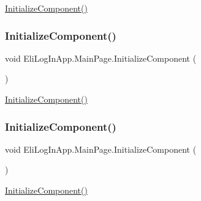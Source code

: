 \hyperlink{class_eli_log_in_app_1_1_main_page_a7f0e43eb30fdabe71d3e986d17322783}{Initialize\+Component()} 

\mbox{\label{class_eli_log_in_app_1_1_main_page_a7f0e43eb30fdabe71d3e986d17322783}} 
\subsubsection{\texorpdfstring{Initialize\+Component()}{InitializeComponent()}\hspace{0.1cm}{\footnotesize\ttfamily [2/3]}}
{\footnotesize\ttfamily void Eli\+Log\+In\+App.\+Main\+Page.\+Initialize\+Component (\begin{DoxyParamCaption}{ }\end{DoxyParamCaption})\hspace{0.3cm}{\ttfamily [inline]}}



\hyperlink{class_eli_log_in_app_1_1_main_page_a7f0e43eb30fdabe71d3e986d17322783}{Initialize\+Component()} 

\mbox{\label{class_eli_log_in_app_1_1_main_page_a7f0e43eb30fdabe71d3e986d17322783}} 
\subsubsection{\texorpdfstring{Initialize\+Component()}{InitializeComponent()}\hspace{0.1cm}{\footnotesize\ttfamily [3/3]}}
{\footnotesize\ttfamily void Eli\+Log\+In\+App.\+Main\+Page.\+Initialize\+Component (\begin{DoxyParamCaption}{ }\end{DoxyParamCaption})\hspace{0.3cm}{\ttfamily [inline]}}



\hyperlink{class_eli_log_in_app_1_1_main_page_a7f0e43eb30fdabe71d3e986d17322783}{Initialize\+Component()} 

